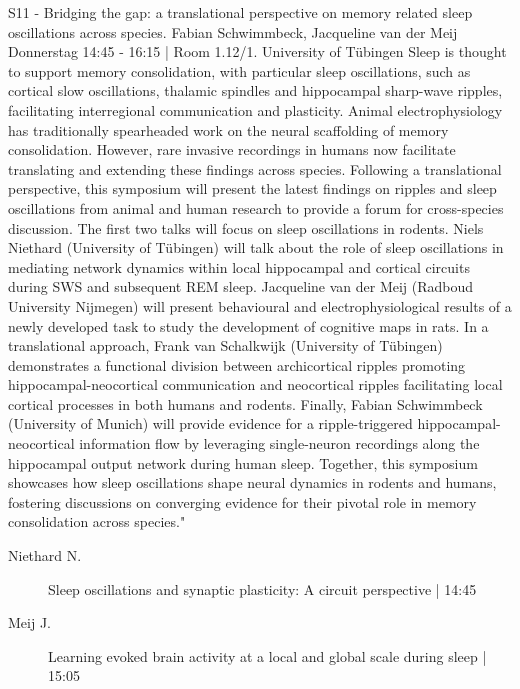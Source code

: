 
            \begin{symposium}
            {S11 - Bridging the gap: a translational perspective on memory related sleep oscillations across species.}
            {Fabian Schwimmbeck, Jacqueline van der Meij}
            {Donnerstag 14:45 - 16:15 | Room 1.12/1.}
            {University of Tübingen}
            Sleep is thought to support memory consolidation, with particular sleep oscillations, such as cortical slow oscillations, thalamic spindles and hippocampal sharp-wave ripples, facilitating interregional communication and plasticity. Animal electrophysiology has traditionally spearheaded work on the neural scaffolding of memory consolidation. However, rare invasive recordings in humans now facilitate translating and extending these findings across species.
Following a translational perspective, this symposium will present the latest findings on ripples and sleep oscillations from animal and human research to provide a forum for cross-species discussion.
The first two talks will focus on sleep oscillations in rodents. Niels Niethard (University of Tübingen) will talk about the role of sleep oscillations in mediating network dynamics within local hippocampal and cortical circuits during SWS and subsequent REM sleep.
Jacqueline van der Meij (Radboud University Nijmegen) will present behavioural and electrophysiological results of a newly developed task to study the development of cognitive maps in rats.
In a translational approach, Frank van Schalkwijk (University of Tübingen) demonstrates a functional division between archicortical ripples promoting hippocampal-neocortical communication and neocortical ripples facilitating local cortical processes in both humans and rodents.
Finally, Fabian Schwimmbeck (University of Munich) will provide evidence for a ripple-triggered hippocampal-neocortical information flow by leveraging single-neuron recordings along the hippocampal output network during human sleep.
Together, this symposium showcases how sleep oscillations shape neural dynamics in rodents and humans, fostering discussions on converging evidence for their pivotal role in memory consolidation across species."
            \begin{description}    
            
                \item [ Niethard N.] Sleep oscillations and synaptic plasticity: A circuit perspective \textcolor{mygray}{ | 14:45}    
                
                \item [ Meij J.] Learning evoked brain activity at a local and global scale during sleep \textcolor{mygray}{ | 15:05}    
                

\end{description}
\end{symposium}
